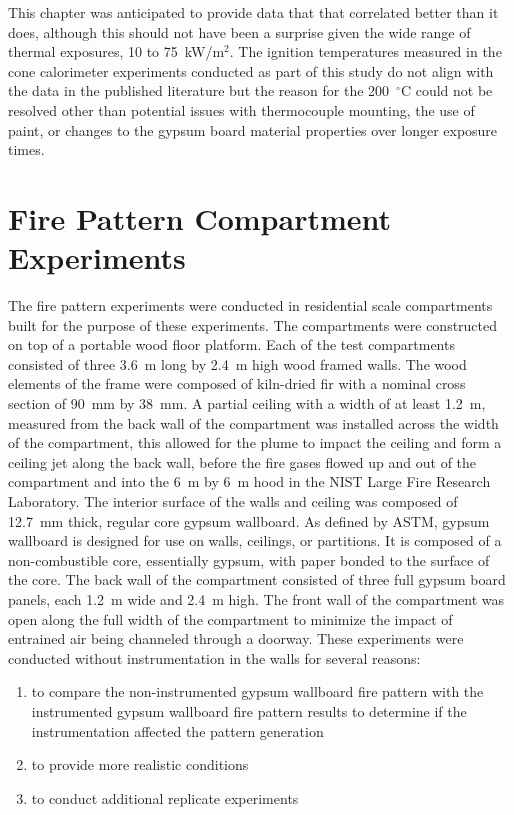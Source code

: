\documentclass[twoside]{uocthesis}
\begin{document}
{This chapter was anticipated to provide data that that correlated better than it does, although this should not have been a surprise given the wide range of thermal exposures, 10 to 75~kW/m$^2$.  The ignition temperatures measured in the cone calorimeter experiments conducted as part of this study do not align with the data in the published literature but the reason for the 200~$^{\circ}$C could not be resolved other than potential issues with thermocouple mounting, the use of paint, or changes to the gypsum board material properties over longer exposure times.       

\chapter{Fire Pattern Compartment Experiments}

The fire pattern experiments were conducted in residential scale compartments built for the purpose of these experiments.  The compartments were constructed on top of a portable wood floor platform.  Each of the test compartments consisted of three 3.6~m long by 2.4~m high wood framed walls. The wood elements of the frame were composed of kiln-dried fir with a nominal cross section of 90~mm by 38~mm.  A partial ceiling with a width of at least 1.2~m, measured from the back wall of the compartment was installed across the width of the compartment, this allowed for the plume to impact the ceiling and form a ceiling jet along the back wall, before the fire gases flowed up and out of the compartment and into the 6~m by 6~m hood in the NIST Large Fire Research Laboratory. The interior surface of the walls and ceiling was composed of 12.7~mm thick, regular core gypsum wallboard. As defined by ASTM, gypsum wallboard is designed for use on walls, ceilings, or partitions.  It is composed of a non-combustible core, essentially gypsum, with paper bonded to the surface of the core. The back wall of the compartment consisted of three full gypsum board panels, each 1.2~m wide and 2.4~m high.  The front wall of the compartment was open along the full width of the compartment to minimize the impact of entrained air being channeled through a doorway. These experiments were conducted without instrumentation in the walls for several reasons:
\begin{enumerate}
\item to compare the non-instrumented gypsum wallboard fire pattern with the instrumented gypsum wallboard fire pattern results to determine if the instrumentation affected the pattern generation
\item to provide more realistic conditions
\item to conduct additional replicate experiments
\end{enumerate}

}
\end{document}
